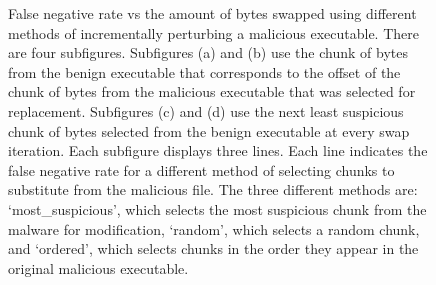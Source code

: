 \documentclass{article}
\begin{document}
\begin{figure}[ht]
	\caption[Theoretically, the three lines in each individual plot should achieve the same evasion rate. The fact that they do not is because of a bizarre feature/bug in the original implementation of the Global-Channel-Gating MalConv. It is not a major issue, but I have been in contact with Edward Raff about the feature/bug on GitHub (https://github.com/NeuromorphicComputationResearchProgram/MalConv2/issues/6)]{False negative rate vs the amount of bytes swapped using different methods of incrementally perturbing a malicious executable. There are four subfigures. Subfigures (a) and (b) use the chunk of bytes from the benign executable that corresponds to the offset of the chunk of bytes from the malicious executable that was selected for replacement. Subfigures (c) and (d) use the next least suspicious chunk of bytes selected from the benign executable at every swap iteration. Each subfigure displays three lines. Each line indicates the false negative rate for a different method of selecting chunks to substitute from the malicious file. The three different methods are: `most\_suspicious', which selects the most suspicious chunk from the malware for modification, `random', which selects a random chunk, and `ordered', which selects chunks in the order they appear in the original malicious executable.\footnotemark}
\end{figure}

\end{document}
